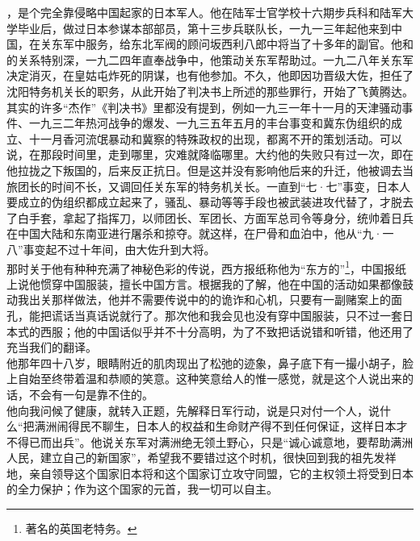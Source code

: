 ，是个完全靠侵略中国起家的日本军人。他在陆军士官学校十六期步兵科和陆军大学毕业后，做过日本参谋本部部员，第十三步兵联队长，一九一三年起他来到中国，在关东军中服务，给东北军阀的顾问坂西利八郎中将当了十多年的副官。他和的关系特别深，一九二四年直奉战争中，他策动关东军帮助过。一九二八年关东军决定消灭，在皇姑屯炸死的阴谋，也有他参加。不久，他即因功晋级大佐，担任了沈阳特务机关长的职务，从此开始了判决书上所述的那些罪行，开始了飞黄腾达。其实的许多“杰作”《判决书》里都没有提到，例如一九三一年十一月的天津骚动事件、一九三二年热河战争的爆发、一九三五年五月的丰台事变和冀东伪组织的成立、十一月香河流氓暴动和冀察的特殊政权的出现，都离不开的策划活动。可以说，在那段时间里，走到哪里，灾难就降临哪里。大约他的失败只有过一次，即在他拉拢之下叛国的，后来反正抗日。但是这并没有影响他后来的升迁，他被调去当旅团长的时间不长，又调回任关东军的特务机关长。一直到“七·七”事变，日本人要成立的伪组织都成立起来了，骚乱、暴动等等手段也被武装进攻代替了，才脱去了白手套，拿起了指挥刀，以师团长、军团长、方面军总司令等身分，统帅着日兵在中国大陆和东南亚进行屠杀和掠夺。就这样，在尸骨和血泊中，他从“九·一八”事变起不过十年间，由大佐升到大将。\\

那时关于他有种种充满了神秘色彩的传说，西方报纸称他为“东方的”\footnote{著名的英国老特务。}，中国报纸上说他惯穿中国服装，擅长中国方言。根据我的了解，他在中国的活动如果都像鼓动我出关那样做法，他并不需要传说中的的诡诈和心机，只要有一副赌案上的面孔，能把谎话当真话说就行了。那次他和我会见也没有穿中国服装，只不过一套日本式的西服；他的中国话似乎并不十分高明，为了不致把话说错和听错，他还用了充当我们的翻译。\\

他那年四十八岁，眼睛附近的肌肉现出了松弛的迹象，鼻子底下有一撮小胡子，脸上自始至终带着温和恭顺的笑意。这种笑意给人的惟一感觉，就是这个人说出来的话，不会有一句是靠不住的。\\

他向我问候了健康，就转入正题，先解释日军行动，说是只对付一个人，说什么“把满洲闹得民不聊生，日本人的权益和生命财产得不到任何保证，这样日本才不得已而出兵”。他说关东军对满洲绝无领土野心，只是“诚心诚意地，要帮助满洲人民，建立自己的新国家”，希望我不要错过这个时机，很快回到我的祖先发祥地，亲自领导这个国家旧本将和这个国家订立攻守同盟，它的主权领土将受到日本的全力保护；作为这个国家的元首，我一切可以自主。\\

